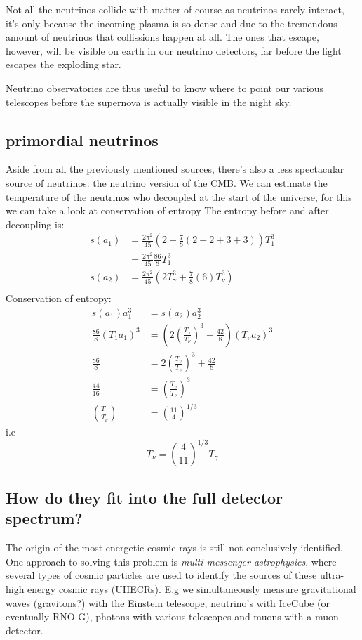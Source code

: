 \documentclass[11pt,a4paper,faculty=we,language=en,doctype=report]{cls/ugent-doc}
\begin{document}
Not all the neutrinos collide with matter of course as neutrinos rarely
interact, it's only because the incoming plasma is so dense and due to the
tremendous amount of neutrinos that collissions happen at all. The ones that
escape, however, will be visible on earth in our neutrino detectors, far before
the light escapes the exploding star.

Neutrino observatories are thus useful to know where to point our various
telescopes before the supernova is actually visible in the night sky.
\subsection{primordial neutrinos}
Aside from all the previously mentioned sources, there's also a less spectacular source of 
neutrinos: the neutrino version of the CMB.
We can estimate the temperature of the neutrinos who decoupled at the start of the universe, 
for this we can take a look at conservation of entropy \cite{Dodelson}
The entropy before and after decoupling is:
\begin{align}
	s(a_1) &= \frac{2\pi^2}{45}(2 + \frac{7}{8}(2+2+3+3))T_1^3\\
	&= \frac{2\pi^2}{45}\frac{86}{8}T_1^3\\
	s(a_2) &= \frac{2\pi^2}{45}(2T_\gamma^3 + \frac{7}{8}(6)T_\nu^3)\\
\end{align}
Conservation of entropy:
\begin{align}
	s(a_1)a_1^3 &= s(a_2)a_2^3\\
	\frac{86}{8}(T_1 a_1)^3 &= \left(2\left(\frac{T_\gamma}{T_\nu}\right)^3 + \frac{42}{8}\right)(T_\nu a_2)^3\\
	\frac{86}{8} &= 2\left(\frac{T_\gamma}{T_\nu}\right)^3 + \frac{42}{8}\\
	\frac{44}{16} &= \left(\frac{T_\gamma}{T_\nu}\right)^3\\
	\left(\frac{T_\gamma}{T_\nu}\right) &= \left(\frac{11}{4}\right)^{1/3}
\end{align}
i.e
\begin{equation}
	T_\nu = \left(\frac{4}{11}\right)^{1/3}T_\gamma
\end{equation}
\subsection{How do they fit into the full detector spectrum?}
The origin of the most energetic cosmic rays is still not conclusively
identified. One approach to solving this problem is \textit{multi-messenger
astrophysics}, where several types of cosmic particles are used to identify the
sources of these ultra-high energy cosmic rays (UHECRs). E.g we simultaneously
measure gravitational waves (gravitons?) with the Einstein telescope,
neutrino's with IceCube (or eventually RNO-G), photons with various telescopes
and muons with a muon detector.
\newpage
\end{document}
